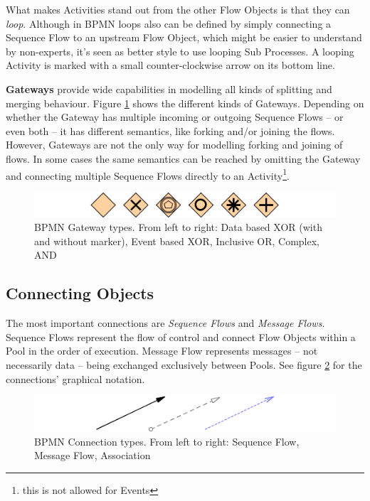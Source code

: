 What makes Activities stand out from the other Flow Objects is that they can \emph{loop}. Although
in BPMN loops also can be defined by simply connecting a Sequence Flow to an upstream Flow Object,
which might be easier to understand by non-experts, it's seen as better style to use looping Sub
Processes. A looping Activity is marked with a small counter-clockwise arrow on its bottom line.

\textbf{Gateways} provide wide capabilities in modelling all kinds of splitting and merging
behaviour. Figure \ref{fig:gateways} shows the different kinds of Gateways. Depending on whether the
Gateway has multiple incoming or outgoing Sequence Flows -- or even both -- it has different
semantics, like forking and/or joining the flows. However, Gateways are not the only way for
modelling forking and joining of flows. In some cases the same semantics can be reached by omitting
the Gateway and connecting multiple Sequence Flows directly to an Activity\footnote{this is not
allowed for Events}.

\begin{figure}[ht]
	\centering
	\includegraphics[width=.75\textwidth]{figures/bpmn/gateways.png}
	\caption[BPMN Gateway types]{BPMN Gateway types. From left to right: Data based XOR (with and
	without marker), Event based XOR, Inclusive OR, Complex, AND}
	\label{fig:gateways}
\end{figure}

\subsection{Connecting Objects}

The most important connections are \emph{Sequence Flows} and \emph{Message Flows}. Sequence Flows
represent the flow of control and connect Flow Objects within a Pool in the order of execution.
Message Flow represents messages -- not necessarily data -- being exchanged exclusively between
Pools. See figure \ref{fig:connections} for the connections' graphical notation.

\begin{figure}[ht]
	\centering
	\includegraphics[width=.75\textwidth]{figures/bpmn/connections.png}
	\caption[BPMN Connection types]{BPMN Connection types. From left to right: Sequence Flow,
	Message Flow, Association}
	\label{fig:connections}
\end{figure}

